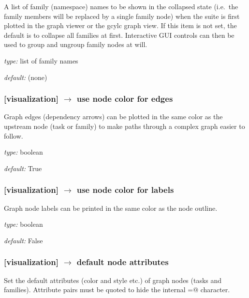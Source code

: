 A list of family (namespace) names to be shown in the collapsed state
(i.e.\ the family members will be replaced by a single family node) when
the suite is first plotted in the graph viewer or the gcylc graph view.
If this item is not set, the default is to collapse all families at first.
Interactive GUI controls can then be used to group and ungroup family
nodes at will.

\begin{myitemize}
    \item {\em type:} list of family names
    \item {\em default:} (none)
\end{myitemize}

\subsubsection[use node color for edges]{[visualization] $\rightarrow$ use node color for edges}

Graph edges (dependency arrows) can be plotted in the same color
as the upstream node (task or family) to make paths through a complex
graph easier to follow.

\begin{myitemize}
    \item {\em type:} boolean
    \item {\em default:} True
\end{myitemize}

\subsubsection[use node color for labels]{[visualization] $\rightarrow$ use node color for labels}

Graph node labels can be printed in the same color as the node outline.

\begin{myitemize}
    \item {\em type:} boolean
    \item {\em default:} False
\end{myitemize}


\subsubsection[default node attributes]{[visualization] $\rightarrow$ default node attributes}

Set the default attributes (color and style etc.) of graph nodes (tasks and families).
Attribute pairs must be quoted to hide the internal \lstinline@=@ character.

